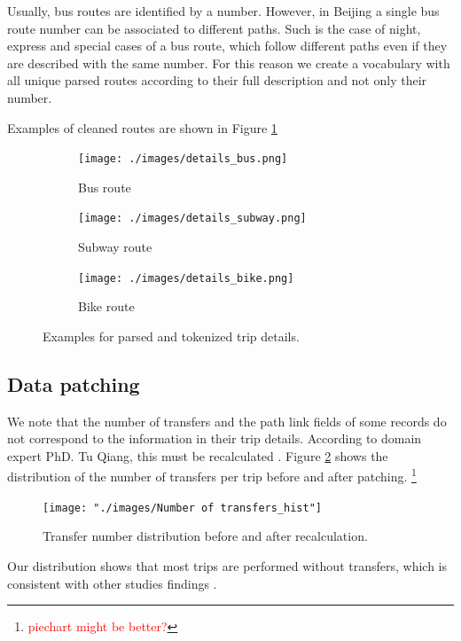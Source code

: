 \documentclass{article}
\newcommand{\selfnote}[1]{\footnote{\textcolor{red}{#1}}}
\begin{document}
Usually, bus routes are identified by a number. However, in Beijing a single bus route number can be associated to different paths. Such is the case of night, express and special cases of a bus route, which follow different paths even if they are described with the same number. For this reason we create a vocabulary with all unique parsed routes according to their full description and not only their number.  

Examples of cleaned routes are shown in Figure \ref{fig:preprocessing/parsed_routes}

\begin{figure}[H]
  \centering
  \begin{subfigure}[b]{.8\textwidth}
  	\centering
  	\texttt{[image: ./images/details\_bus.png]}
  	\caption{Bus route}
  \end{subfigure}
  \begin{subfigure}[b]{.8\textwidth}
  	\centering
  	\texttt{[image: ./images/details\_subway.png]}
  	\caption{Subway route}
  \end{subfigure}
    \begin{subfigure}[b]{.8\textwidth}
  	\centering
  	\texttt{[image: ./images/details\_bike.png]}
  	\caption{Bike route}
  \end{subfigure}
  \caption{Examples for parsed and tokenized trip details.}
  	\label{fig:preprocessing/parsed_routes}
\end{figure}



\subsection{Data patching}
We note that the number of transfers and the path link fields of some records do not correspond to the information in their trip details. According to domain expert PhD. Tu Qiang, this must be recalculated \cite{tommy}. Figure \ref{fig:preprocessing/num_transfers} shows the distribution of the number of transfers per trip before and after patching. \selfnote{piechart might be better?}


\begin{figure}[H]
  \centering
  \texttt{[image: "./images/Number of transfers\_hist"]}
  \caption{Transfer number distribution before and after recalculation.}
  \label{fig:preprocessing/num_transfers}
\end{figure}

Our distribution shows that most trips are performed without transfers, which is consistent with other studies findings \cite{bhaskar2015passenger}.
\end{document}
